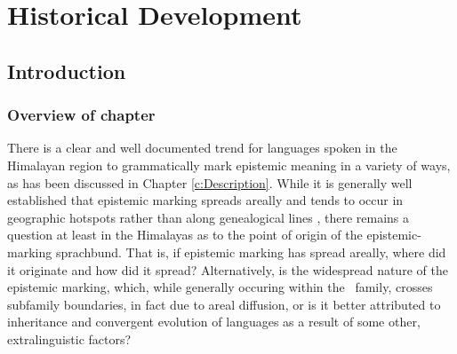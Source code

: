 \chapter{Historical Development}\label{c:History}
\section{Introduction}
\subsection{Overview of chapter}
There is a clear and well documented trend for languages spoken in the Himalayan region to grammatically mark epistemic meaning in a variety of ways, as has been discussed in Chapter \ref{c:Description}. While it is generally well established that epistemic marking spreads areally and tends to occur in geographic hotspots rather than along genealogical lines \cites[288]{Aikhenvald2004}{SanRoque2012}{Verhees2018}, there remains a question at least in the Himalayas as to the point of origin of the epistemic-marking sprachbund. That is, if epistemic marking has spread areally, where did it originate and how did it spread? Alternatively, is the widespread nature of the epistemic marking, which, while generally occuring within the \lfam\ family, crosses subfamily boundaries, in fact due to areal diffusion, or is it better attributed to inheritance and convergent evolution of languages as a result of some other, extralinguistic factors?

